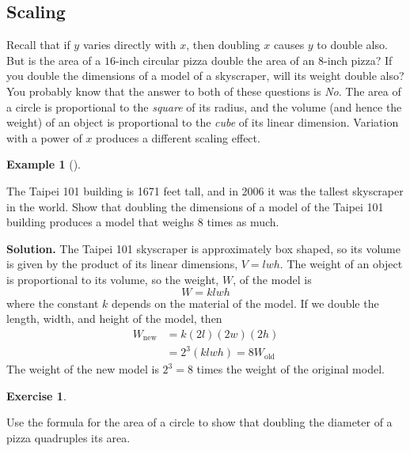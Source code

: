 \documentclass[10pt,]{book}
\theoremstyle{plain}
\theoremstyle{definition}
\theoremstyle{definition}
\theoremstyle{definition}
\newtheorem{example}[theorem]{Example}
\theoremstyle{definition}
\theoremstyle{definition}
\newtheorem{exercise}[theorem]{Exercise}
\numberwithin{equation}{section}
\newcommand{\amp}{ & }
\begin{document}
\subsection[Scaling]{Scaling}\label{subsection-60}
\index{}
	Recall that if \(y\) varies directly with \(x\), then doubling \(x\) causes \(y\) to double also. But is the area of a \(16\)-inch circular pizza double the area of an \(8\)-inch pizza? If you double the dimensions of a model of a skyscraper, will its weight double also? You probably know that the answer to both of these questions is \emph{No}. The area of a circle is proportional to the \emph{square} of its radius, and the volume (and hence the weight) of an object is proportional to the \emph{cube} of its linear dimension. Variation with a power of \(x\) produces a different scaling effect.
%
\begin{example}[]\label{example-scaling-weight}

	The Taipei 101 building is 1671 feet tall, and in 2006 it was the tallest skyscraper in the world. Show that doubling the dimensions of a model of the Taipei 101 building produces a model that weighs \(8\) times as much.
%
\par\medskip\noindent%
\textbf{Solution.}\quad 
	The Taipei 101 skyscraper is approximately box shaped, so its volume is given by the product of its linear dimensions, \(V = lwh\). The weight of an object is proportional to its volume, so the weight, \(W\), of the model is
	\begin{equation*}W = klwh\end{equation*}
	where the constant \(k\) depends on the material of the model. If we double the length, width, and height of the model, then
	\begin{equation*}
		\begin{aligned}
		W_\text{new} \amp = k(2l)(2w)(2h)\\
		\amp = 2^3(klwh) = 8W_\text{old}
		\end{aligned}
	\end{equation*}
	The weight of the new model is \(2^3 = 8\) times the weight of the original model.
\end{example}
\begin{exercise}\label{exercise-double-pizza-diameter}

	Use the formula for the area of a circle to show that doubling the diameter of a pizza quadruples its area.
\end{exercise}
\par
\end{document}
